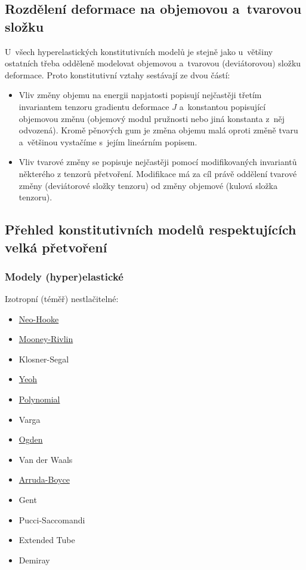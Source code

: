 \subsection{Rozdělení deformace na objemovou a~tvarovou složku}
U~všech hyperelastických konstitutivních modelů je stejně jako u~většiny ostatních třeba odděleně modelovat objemovou a~tvarovou (deviátorovou) složku deformace.
Proto konstitutivní vztahy sestávají ze dvou částí:
\begin{itemize}
	\item Vliv změny objemu na energii napjatosti popisují nejčastěji třetím invariantem tenzoru gradientu deformace $J$ a~konstantou popisující objemovou změnu (objemový modul pružnosti nebo jiná konstanta z~něj odvozená). Kromě pěnových gum je změna objemu malá oproti změně tvaru a~většinou vystačíme s~jejím lineárním popisem.
	\item Vliv tvarové změny se popisuje nejčastěji pomocí modifikovaných invariantů některého z tenzorů přetvoření. Modifikace má za cíl právě oddělení tvarové změny (deviátorové složky tenzoru) od změny objemové (kulová složka tenzoru).
\end{itemize}

\subsection{Přehled konstitutivních modelů respektujících velká přetvoření}
\subsubsection{Modely (hyper)elastické}
Izotropní (téměř) nestlačitelné: 
\begin{itemize}
	\item \hyperref[sec:neo-hooke]{Neo-Hooke}
	\item \hyperref[sec:mooney-rivlin]{Mooney-Rivlin}
	\item Klosner-Segal
	\item \hyperref[sec:yeoh]{Yeoh}
	\item \hyperref[sec:polynomicky-model]{Polynomial}
	\item Varga
	\item \hyperref[sec:model-ogden]{Ogden}
	\item Van der Waals
	\item \hyperref[sec:arruda-boyce]{Arruda-Boyce}
	\item Gent
	\item Pucci-Saccomandi
	\item Extended Tube
	\item Demiray
\end{itemize}

